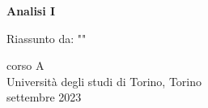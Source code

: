 \begin{titlepage}
   \begin{center}
       \vspace*{1cm}
        
       \textbf{\LARGE Analisi I}

       \vspace{0.5cm}
        Riassunto da: ""


       \vfill
            
       
            
       \vspace{0.8cm}
     
       
            
       corso A\\
       Università degli studi di Torino, Torino\\
       settembre 2023\\
       
            
   \end{center}
\end{titlepage}

